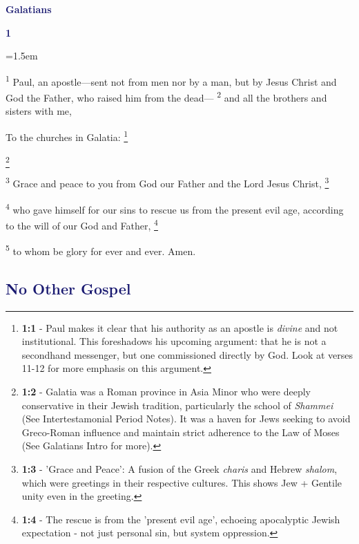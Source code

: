 \documentclass[12pt,twoside]{article}
\newcommand{\vs}[1]{\textsuperscript{#1}}
\newcommand{\vnote}[2]{%
  \begingroup
  \renewcommand\thefootnote{}%
  \footnote{\scriptsize \textbf{}#2}%
  \addtocounter{footnote}{-1}%
  \endgroup
}
\newcommand{\chapterWithIndent}[2]{%
  \noindent
  \begin{minipage}[t]{1cm}
    \vspace{-0.4\baselineskip}
    {\textcolor{MidnightBlue}{\fontsize{40pt}{48pt}\selectfont \textbf{#1}}}
  \end{minipage}%
  \hspace{0.3cm}%
  \begin{minipage}[t]{\dimexpr\linewidth - 1.5cm - 0.3cm\relax}
    \hangindent=1.5em
    \hangafter=3
    #2
    \vspace{0.05cm}
  \end{minipage}
}
\begin{document}
\begin{center}
{\textcolor{MidnightBlue}{\fontsize{40pt}{48pt}\selectfont \textbf{Galatians}}}\\
\vspace{2cm}
\vspace{-1cm}
\end{center}
\thispagestyle{fancy}



\chapterWithIndent{1}{
    \vs{1} Paul, an apostle---sent not from men nor by a man, but by Jesus Christ and God the Father, who raised him from the dead---
    \vs{2} and all the brothers and sisters with me,\vspace{0.5cm}
}

To the churches in Galatia:\vspace{0.5cm}\vnote{1}{\textbf{1:1} - Paul makes it clear that his authority as an apostle is \textit{divine} and not institutional. This foreshadows his upcoming argument: that he is not a secondhand messenger, but one commissioned directly by God. Look at verses 11-12 for more emphasis on this argument.}
\vnote{2}{\textbf{1:2} - Galatia was a Roman province in Asia Minor who were deeply conservative in their Jewish tradition, particularly the school of \textit{Shammei} (See Intertestamonial Period Notes). It was a haven for Jews seeking to avoid Greco-Roman influence and maintain strict adherence to the Law of Moses (See Galatians Intro for more).}

\vs{3} Grace and peace to you from God our Father and the Lord Jesus Christ,\vnote{3}{\textbf{1:3} - 'Grace and Peace': A fusion of the Greek \textit{charis} and Hebrew \textit{shalom}, which were greetings in their respective cultures. This shows Jew + Gentile unity even in the greeting.}
\vs{4} who gave himself for our sins to rescue us from the present evil age, according to the will of our God and Father,\vnote{4}{\textbf{1:4} - The rescue is from the 'present evil age', echoeing apocalyptic Jewish expectation - not just personal sin, but system oppression.}
\vs{5} to whom be glory for ever and ever. Amen.

\subsection*{\textcolor{MidnightBlue}{\textbf{No Other Gospel}}}
\end{document}
